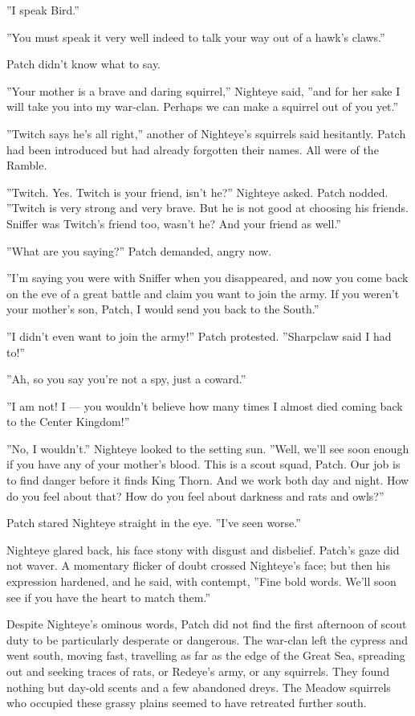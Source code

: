 \documentclass[12pt]{book}
\begin{document}
''I speak Bird.''

''You must speak it very well indeed to talk your way out of a hawk's
claws.''

Patch didn't know what to say.

''Your mother is a brave and daring squirrel,'' Nighteye said, ''and
for her sake I will take you into my war-clan. Perhaps we can make a
squirrel out of you yet.''

''Twitch says he's all right,'' another of Nighteye's squirrels said
hesitantly. Patch had been introduced but had already forgotten their
names. All were of the Ramble.

''Twitch. Yes. Twitch is your friend, isn't he?'' Nighteye
asked. Patch nodded. ''Twitch is very strong and very brave. But he is
not good at choosing his friends. Sniffer was Twitch's friend too,
wasn't he? And your friend as well.''

''What are you saying?'' Patch demanded, angry now.

''I'm saying you were with Sniffer when you disappeared, and now you
come back on the eve of a great battle and claim you want to join the
army. If you weren't your mother's son, Patch, I would send you back
to the South.''

''I didn't even want to join the army!'' Patch protested. ''Sharpclaw
said I had to!''

''Ah, so you say you're not a spy, just a coward.''

''I am not! I --- you wouldn't believe how many times I almost died
coming back to the Center Kingdom!''

''No, I wouldn't.'' Nighteye looked to the setting sun. ''Well, we'll
see soon enough if you have any of your mother's blood. This is a
scout squad, Patch. Our job is to find danger before it finds King
Thorn. And we work both day and night. How do you feel about that? How
do you feel about darkness and rats and owls?''

Patch stared Nighteye straight in the eye. ''I've seen worse.''

Nighteye glared back, his face stony with disgust and
disbelief. Patch's gaze did not waver. A momentary flicker of doubt
crossed Nighteye's face; but then his expression hardened, and he
said, with contempt, ''Fine bold words. We'll soon see if you have the
heart to match them.''

Despite Nighteye's ominous words, Patch did not find the first
afternoon of scout duty to be particularly desperate or dangerous. The
war-clan left the cypress and went south, moving fast, travelling as
far as the edge of the Great Sea, spreading out and seeking traces of
rats, or Redeye's army, or any squirrels. They found nothing but
day-old scents and a few abandoned dreys. The Meadow squirrels who
occupied these grassy plains seemed to have retreated further south.
\end{document}
